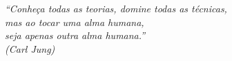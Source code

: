 \begin{epigrafe}
	\vspace*{\fill}
	\begin{flushright}
		\textit{``Conheça todas as teorias, domine todas as técnicas,\\ mas ao tocar uma alma humana,\\ seja apenas outra alma humana.''\\ (Carl Jung)}
	\end{flushright}
\end{epigrafe}
